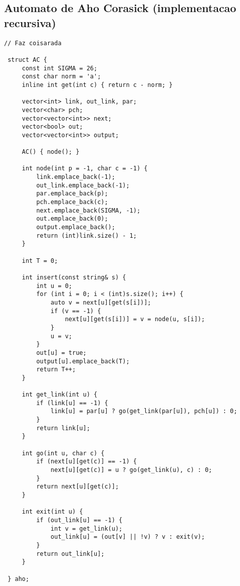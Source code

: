 \documentclass[11pt, a4paper, twoside]{article}
\begin{document}
\subsection{Automato de Aho Corasick (implementacao recursiva)}
\begin{lstlisting}
// Faz coisarada

 struct AC {
     const int SIGMA = 26;
     const char norm = 'a';
     inline int get(int c) { return c - norm; }
  
     vector<int> link, out_link, par;
     vector<char> pch;
     vector<vector<int>> next;
     vector<bool> out;
     vector<vector<int>> output;
 
     AC() { node(); }
 
     int node(int p = -1, char c = -1) {
         link.emplace_back(-1);
         out_link.emplace_back(-1);
         par.emplace_back(p);
         pch.emplace_back(c);
         next.emplace_back(SIGMA, -1);
         out.emplace_back(0);
         output.emplace_back();
         return (int)link.size() - 1;
     }
  
     int T = 0;
  
     int insert(const string& s) {
         int u = 0;
         for (int i = 0; i < (int)s.size(); i++) {
             auto v = next[u][get(s[i])];
             if (v == -1) {
                 next[u][get(s[i])] = v = node(u, s[i]);
             }
             u = v;
         }
         out[u] = true;
         output[u].emplace_back(T);
         return T++;
     }
  
     int get_link(int u) {
         if (link[u] == -1) {
             link[u] = par[u] ? go(get_link(par[u]), pch[u]) : 0;
         }
         return link[u];
     }
  
     int go(int u, char c) {
         if (next[u][get(c)] == -1) {
             next[u][get(c)] = u ? go(get_link(u), c) : 0;
         }
         return next[u][get(c)];
     }
  
     int exit(int u) {
         if (out_link[u] == -1) {
             int v = get_link(u);
             out_link[u] = (out[v] || !v) ? v : exit(v);
         }
         return out_link[u];
     }
  
 } aho;
\end{lstlisting}
\end{document}
